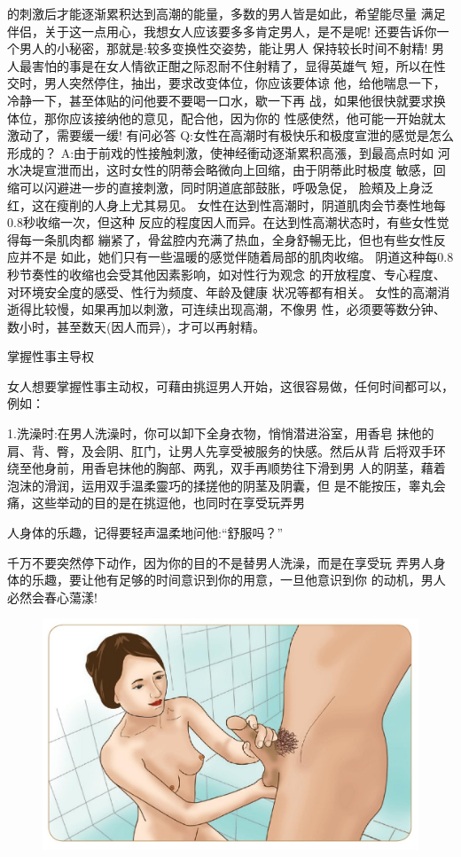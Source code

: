 \documentclass[12pt,UTF8]{ctexbook}
\begin{document}
的刺激后才能逐渐累积达到高潮的能量，多数的男人皆是如此，希望能尽量
满足伴侣，关于这一点用心，我想女人应该要多多肯定男人，是不是呢!
还要告诉你一个男人的小秘密，那就是:较多变换性交姿势，能让男人
保持较长时间不射精!
男人最害怕的事是在女人情欲正酣之际忍耐不住射精了，显得英雄气
短，所以在性交时，男人突然停住，抽出，要求改变体位，你应该要体谅
他，给他喘息一下，冷静一下，甚至体贴的问他要不要喝一口水，歇一下再
战，如果他很快就要求换体位，那你应该接纳他的意见，配合他，因为你的
性感使然，他可能一开始就太激动了，需要缓一缓!
有问必答
Q:女性在高潮时有极快乐和极度宣泄的感觉是怎么形成的？
A:由于前戏的性接触刺激，使神经衝动逐渐累积高漲，到最高点时如
河水决堤宣泄而出，这时女性的阴蒂会略微向上回缩，由于阴蒂此时极度
敏感，回缩可以闪避进一步的直接刺激，同时阴道底部鼓胀，呼吸急促，
脸頰及上身泛红，这在瘦削的人身上尤其易见。
女性在达到性高潮时，阴道肌肉会节奏性地每0.8秒收缩一次，但这种
反应的程度因人而异。在达到性高潮状态时，有些女性觉得每一条肌肉都
繃紧了，骨盆腔内充满了热血，全身舒暢无比，但也有些女性反应并不是
如此，她们只有一些温暖的感觉伴随着局部的肌肉收缩。
阴道这种每0.8秒节奏性的收缩也会受其他因素影响，如对性行为观念
的开放程度、专心程度、对环境安全度的感受、性行为频度、年龄及健康
状况等都有相关。
女性的高潮消逝得比较慢，如果再加以刺激，可连续出现高潮，不像男
性，必须要等数分钟、数小时，甚至数天(因人而异)，才可以再射精。

掌握性事主导权

女人想要掌握性事主动权，可藉由挑逗男人开始，这很容易做，任何时间都可以，例如：

1.洗澡时:在男人洗澡时，你可以卸下全身衣物，悄悄潜进浴室，用香皂
抹他的肩、背、臀，及会阴、肛门，让男人先享受被服务的快感。然后从背
后将双手环绕至他身前，用香皂抹他的胸部、两乳，双手再顺势往下滑到男
人的阴茎，藉着泡沫的滑润，运用双手温柔靈巧的揉搓他的阴茎及阴囊，但
是不能按压，睾丸会痛，这些举动的目的是在挑逗他，也同时在享受玩弄男

人身体的乐趣，记得要轻声温柔地问他:“舒服吗？”

千万不要突然停下动作，因为你的目的不是替男人洗澡，而是在享受玩
弄男人身体的乐趣，要让他有足够的时间意识到你的用意，一旦他意识到你
的动机，男人必然会春心蕩漾!

\begin{figure}[htbp]
	\centering
	\includegraphics[width=0.7\linewidth]{14}
	\caption{}
	\label{fig:1}
\end{figure}
\end{document}
